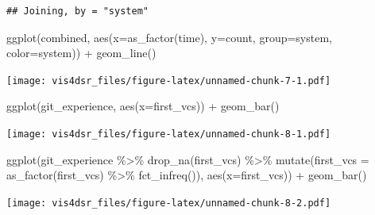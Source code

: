 \documentclass[
]{krantz}
\makeatletter
\newenvironment{Shaded}{\begin{snugshade}}{\end{snugshade}}
\newcommand{\AttributeTok}[1]{\textcolor[rgb]{0.61,0.61,0.61}{#1}}
\newcommand{\FunctionTok}[1]{\textcolor[rgb]{0,0,0}{#1}}
\newcommand{\NormalTok}[1]{#1}
\newcommand{\SpecialCharTok}[1]{\textcolor[rgb]{0,0,0}{#1}}
\newenvironment{kframe}{%
\medskip{}
\setlength{\fboxsep}{.8em}
 \def\at@end@of@kframe{}%
 \ifinner\ifhmode%
  \def\at@end@of@kframe{\end{minipage}}%
  \begin{minipage}{\columnwidth}%
 \fi\fi%
 \def\FrameCommand##1{\hskip\@totalleftmargin \hskip-\fboxsep
 \colorbox{shadecolor}{##1}\hskip-\fboxsep
     \hskip-\linewidth \hskip-\@totalleftmargin \hskip\columnwidth}%
 \MakeFramed {\advance\hsize-\width
   \@totalleftmargin\z@ \linewidth\hsize
   \@setminipage}}%
 {\par\unskip\endMakeFramed%
 \at@end@of@kframe}
\renewenvironment{Shaded}{\begin{kframe}}{\end{kframe}}
\makeatother
\begin{document}
\begin{verbatim}
## Joining, by = "system"
\end{verbatim}

\begin{Shaded}
\begin{Highlighting}[]
\FunctionTok{ggplot}\NormalTok{(combined, }\FunctionTok{aes}\NormalTok{(}\AttributeTok{x=}\FunctionTok{as\_factor}\NormalTok{(time), }\AttributeTok{y=}\NormalTok{count, }\AttributeTok{group=}\NormalTok{system, }\AttributeTok{color=}\NormalTok{system)) }\SpecialCharTok{+}
  \FunctionTok{geom\_line}\NormalTok{()}
\end{Highlighting}
\end{Shaded}

\texttt{[image: vis4dsr\_files/figure-latex/unnamed-chunk-7-1.pdf]}

\begin{Shaded}
\begin{Highlighting}[]
\FunctionTok{ggplot}\NormalTok{(git\_experience, }\FunctionTok{aes}\NormalTok{(}\AttributeTok{x=}\NormalTok{first\_vcs)) }\SpecialCharTok{+}
  \FunctionTok{geom\_bar}\NormalTok{()}
\end{Highlighting}
\end{Shaded}

\texttt{[image: vis4dsr\_files/figure-latex/unnamed-chunk-8-1.pdf]}

\begin{Shaded}
\begin{Highlighting}[]
\FunctionTok{ggplot}\NormalTok{(git\_experience }\SpecialCharTok{\%\textgreater{}\%}
         \FunctionTok{drop\_na}\NormalTok{(first\_vcs) }\SpecialCharTok{\%\textgreater{}\%}
         \FunctionTok{mutate}\NormalTok{(}\AttributeTok{first\_vcs =} \FunctionTok{as\_factor}\NormalTok{(first\_vcs) }\SpecialCharTok{\%\textgreater{}\%} 
             \FunctionTok{fct\_infreq}\NormalTok{()), }
         \FunctionTok{aes}\NormalTok{(}\AttributeTok{x=}\NormalTok{first\_vcs)) }\SpecialCharTok{+}
  \FunctionTok{geom\_bar}\NormalTok{()}
\end{Highlighting}
\end{Shaded}

\texttt{[image: vis4dsr\_files/figure-latex/unnamed-chunk-8-2.pdf]}
\end{document}
